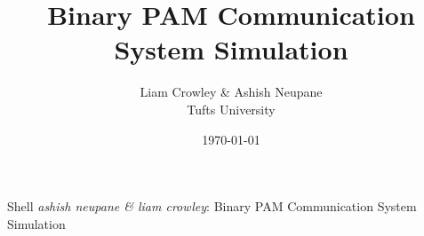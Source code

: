 \documentclass[11pt, journal, twocolumn]{IEEEtran}
\begin{document}
\title{Binary PAM Communication System Simulation}
\author{Liam Crowley \& Ashish Neupane \\ Tufts University}
\date{\today}
{Shell \MakeLowercase{\textit{Ashish Neupane \& Liam Crowley}}: Binary PAM Communication System Simulation}
\begin{spacing}{1}
\maketitle
\end{spacing}\vspace{-2em}

%
%
\newpage

\end{document}
